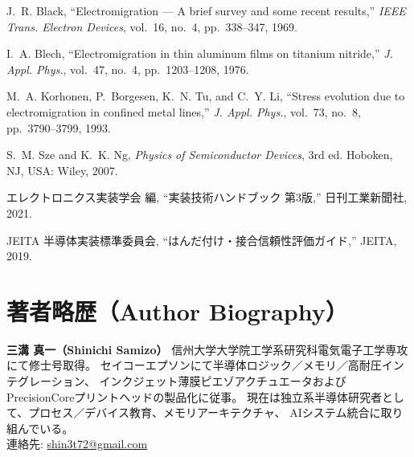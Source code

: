 \documentclass[onecolumn]{IEEEtran} %
\begin{document}
\balance

\begin{thebibliography}{99}

J.~R. Black, ``Electromigration --- A brief survey and some recent results,''
\emph{IEEE Trans. Electron Devices}, vol.~16, no.~4, pp.~338--347, 1969.

I.~A. Blech, ``Electromigration in thin aluminum films on titanium nitride,''
\emph{J. Appl. Phys.}, vol.~47, no.~4, pp.~1203--1208, 1976.

M.~A. Korhonen, P.~Borgesen, K.~N. Tu, and C.~Y. Li,
``Stress evolution due to electromigration in confined metal lines,''
\emph{J. Appl. Phys.}, vol.~73, no.~8, pp.~3790--3799, 1993.

S.~M. Sze and K.~K. Ng, \emph{Physics of Semiconductor Devices}, 3rd ed.
Hoboken, NJ, USA: Wiley, 2007.

エレクトロニクス実装学会 編,
``実装技術ハンドブック 第3版,'' 日刊工業新聞社, 2021.

JEITA 半導体実装標準委員会,
``はんだ付け・接合信頼性評価ガイド,'' JEITA, 2019.

\end{thebibliography}

\section*{著者略歴（Author Biography）}
\textbf{三溝 真一（Shinichi Samizo）} 信州大学大学院工学系研究科電気電子工学専攻にて修士号取得。
セイコーエプソンにて半導体ロジック／メモリ／高耐圧インテグレーション、
インクジェット薄膜ピエゾアクチュエータおよびPrecisionCoreプリントヘッドの製品化に従事。
現在は独立系半導体研究者として、プロセス／デバイス教育、メモリアーキテクチャ、
AIシステム統合に取り組んでいる。\\
連絡先: \href{mailto:shin3t72@gmail.com}{shin3t72@gmail.com}
\end{document}
